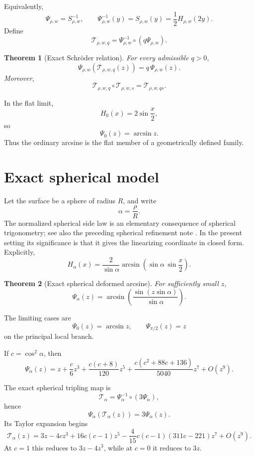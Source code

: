 \documentclass[11pt]{article}
\newtheorem{theorem}{Theorem}[section]
\theoremstyle{definition}
\theoremstyle{remark}
\newcommand{\cT}{\mathcal{T}}
\begin{document}
Equivalently,
\[
\Psi_{\rho,w}=S_{\rho,w}^{-1},
\qquad
\Psi_{\rho,w}^{-1}(y)
=
S_{\rho,w}(y)
=
\frac12H_{\rho,w}(2y).
\]
Define
\[
\cT_{\rho,w,q}
=
\Psi_{\rho,w}^{-1}\circ(q\Psi_{\rho,w}).
\]

\begin{theorem}[Exact Schr\"oder relation]
\label{thm:schroder}
For every admissible \(q>0\),
\[
\boxed{
\Psi_{\rho,w}\!\left(\cT_{\rho,w,q}(z)\right)
=
q\,\Psi_{\rho,w}(z).
}
\]
Moreover,
\[
\cT_{\rho,w,q}\circ\cT_{\rho,w,s}
=
\cT_{\rho,w,qs}.
\]
\end{theorem}

In the flat limit,
\[
H_0(x)=2\sin\frac{x}{2},
\]
so
\[
\boxed{\Psi_0(z)=\arcsin z.}
\]
Thus the ordinary arcsine is the flat member of a geometrically defined
family.

\section{Exact spherical model}
\label{sec:sphere}

Let the surface be a sphere of radius \(R\), and write
\[
\alpha=\frac{\rho}{R}.
\]
The normalized spherical side law is an elementary consequence of spherical
trigonometry; see also the preceding spherical refinement note
\cite{BakerSphere}.  In the present setting its significance is that it gives
the linearizing coordinate in closed form.  Explicitly,
\[
\boxed{
H_\alpha(x)
=
\frac{2}{\sin\alpha}
\arcsin\!\left(
\sin\alpha\,
\sin\frac{x}{2}
\right).
}
\]

\begin{theorem}[Exact spherical deformed arcsine]
\label{thm:spherical-psi}
For sufficiently small \(z\),
\[
\boxed{
\Psi_\alpha(z)
=
\arcsin\!\left(
\frac{\sin(z\sin\alpha)}{\sin\alpha}
\right).
}
\]
\end{theorem}

The limiting cases are
\[
\Psi_0(z)=\arcsin z,
\qquad
\Psi_{\pi/2}(z)=z
\]
on the principal local branch.

If \(c=\cos^2\alpha\), then
\[
\Psi_\alpha(z)
=
z+\frac{c}{6}z^3
+\frac{c(c+8)}{120}z^5
+\frac{c(c^2+88c+136)}{5040}z^7
+O(z^9).
\]

The exact spherical tripling map is
\[
\cT_\alpha
=
\Psi_\alpha^{-1}\circ(3\Psi_\alpha),
\]
hence
\[
\Psi_\alpha(\cT_\alpha(z))=3\Psi_\alpha(z).
\]
Its Taylor expansion begins
\[
\cT_\alpha(z)
=
3z-4cz^3
+16c(c-1)z^5
-\frac4{15}c(c-1)(311c-221)z^7
+O(z^9).
\]
At \(c=1\) this reduces to \(3z-4z^3\), while at \(c=0\) it reduces to
\(3z\).
\end{document}
